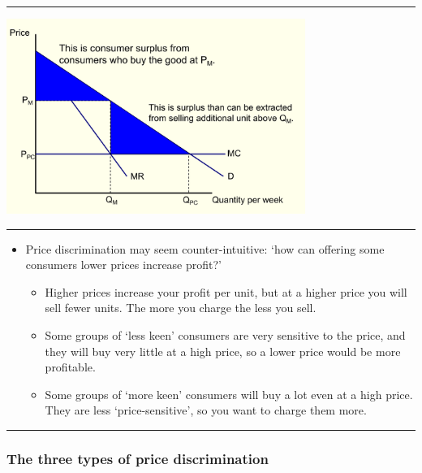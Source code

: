 \documentclass[]{article}
\providecommand{\tightlist}{%
  \setlength{\itemsep}{0pt}\setlength{\parskip}{0pt}}
\begin{document}
\begin{center}\rule{0.5\linewidth}{\linethickness}\end{center}

\includegraphics[height=2.5in]{picsfigs/ppd2.png}

\begin{center}\rule{0.5\linewidth}{\linethickness}\end{center}

\begin{itemize}
\tightlist
\item
  Price discrimination may seem counter-intuitive: `how can offering
  some consumers lower prices increase profit?'

  \begin{itemize}
  \tightlist
  \item
    Higher prices increase your profit per unit, but at a higher price
    you will sell fewer units. The more you charge the less you sell.
  \item
    Some groups of `less keen' consumers are very sensitive to the
    price, and they will buy very little at a high price, so a lower
    price would be more profitable.
  \item
    Some groups of `more keen' consumers will buy a lot even at a high
    price. They are less `price-sensitive', so you want to charge them
    more.
  \end{itemize}
\end{itemize}

\begin{center}\rule{0.5\linewidth}{\linethickness}\end{center}

\hypertarget{the-three-types-of-price-discrimination}{%
\subsubsection{The three types of price
discrimination}\label{the-three-types-of-price-discrimination}}
\end{document}
